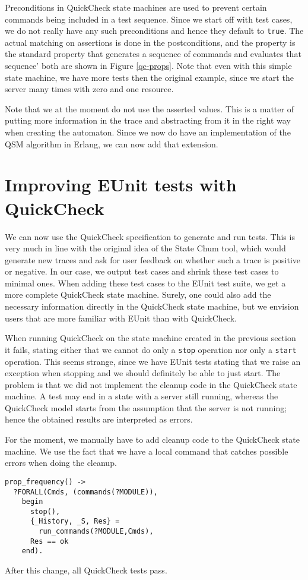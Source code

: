 \documentclass[]{sigplanconf}
\begin{document}
Preconditions in QuickCheck state machines are used to prevent certain commands being included in a test sequence. Since we start off with test cases, we do not really have any such preconditions and hence they default to \verb+true+. The actual matching on assertions is done in the postconditions, and the property is the standard property that generates a sequence of commands and evaluates that sequence' both are shown in Figure \ref{qc-props}. Note that even with this simple state machine, we 
have more tests then the original example, since we start the server many times with zero and one resource.

Note that we at the moment do not use the asserted values. This is a matter of putting more information in the trace and abstracting from it in the right way when creating the automaton. 
Since we now do have an implementation of the QSM algorithm in Erlang, we can now
add that extension.

\section{Improving EUnit tests with QuickCheck}
\label{improving}

We can now use the QuickCheck specification to generate and run tests. This is very much in line with the original idea of the State Chum tool, which would generate new traces and ask for user feedback on whether such a trace is positive or negative. In our case, we output test cases and shrink these test cases to minimal ones. When adding these test cases to the EUnit test suite, we get a more complete QuickCheck state machine. Surely, one could also add the necessary information directly in the QuickCheck state machine, but we envision users that are more familiar with EUnit than with QuickCheck.

When running  QuickCheck on the state machine created in the previous section it fails, stating either that we cannot do only a \texttt{stop} operation nor only a \texttt{start} operation.
This seems strange, since we have EUnit tests stating that we raise an exception when stopping and we should definitely be able to just start. The problem is that we did not implement the cleanup code in the QuickCheck state machine. A test may end in a state with a server still running, whereas the QuickCheck model starts from the assumption that the server is not running; hence the obtained results are interpreted as errors.

For the moment, we manually have to add cleanup code to the QuickCheck state machine. We use the fact that we have a local command that catches possible errors when doing the cleanup.
\begin{verbatim}
prop_frequency() ->
  ?FORALL(Cmds, (commands(?MODULE)),
    begin
      stop(),
      {_History, _S, Res} = 
        run_commands(?MODULE,Cmds), 
      Res == ok
    end).      
\end{verbatim}   
After this change, all QuickCheck tests pass.
\end{document}
